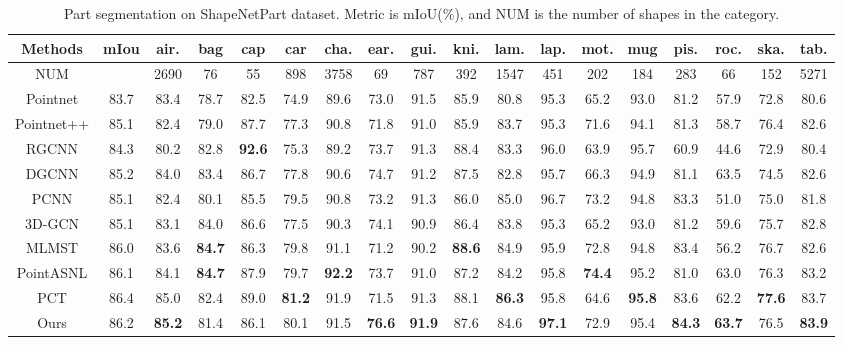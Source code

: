 \documentclass[conference]{IEEEtran}
\begin{document}
\begin{table*}[t]
\caption{Part segmentation  on ShapeNetPart dataset. Metric is mIoU(\%), and NUM is the number of shapes  in the category.}
\begin{center}
\vspace{-4mm}
\resizebox{1\textwidth}{19mm}
{
\begin{tabular}{c|c|c|c|c|c|c|c|c|c|c|c|c|c|c|c|c|c}
\hline
Methods& mIou & air. & bag & cap  & car & cha. & ear.  & gui. & kni. & lam. & lap. & mot. & mug & pis. & roc. & ska.  & tab.\\
\hline
NUM &  & 2690 & 76 & 55 & 898 & 3758 & 69 & 787 & 392 & 1547 & 451 & 202 & 184 & 283 & 66 & 152 & 5271 \\
\hline
Pointnet\cite{qi2017pointnet} & 83.7 & 83.4 &78.7 & 82.5 & 74.9 & 89.6 & 73.0 & 91.5 & 85.9 & 80.8 & 95.3 &65.2 & 93.0 & 81.2 & 57.9 & 72.8 & 80.6 \\
Pointnet++\cite{qi2017pointnet++} & 85.1 & 82.4 &79.0 & 87.7 & 77.3 & 90.8 & 71.8 & 91.0 & 85.9 & 83.7 & 95.3 &71.6 & 94.1 & 81.3 & 58.7 & 76.4 & 82.6 \\
RGCNN\cite{te2018rgcnn} & 84.3 & 80.2 &82.8 & \textbf{92.6} & 75.3 & 89.2 & 73.7 & 91.3 & 88.4 & 83.3 & 96.0 &63.9 & 95.7 & 60.9 & 44.6 & 72.9 & 80.4\\
DGCNN\cite{wang2019dynamic} & 85.2 & 84.0 &83.4 & 86.7 & 77.8 & 90.6 & 74.7 & 91.2 & 87.5 & 82.8 & 95.7 &66.3 & 94.9 & 81.1 & 63.5 & 74.5 & 82.6\\
PCNN\cite{atzmon2018point} & 85.1 & 82.4 &80.1 & 85.5 & 79.5 & 90.8 & 73.2 & 91.3 & 86.0 & 85.0 & 96.7 &73.2 & 94.8 & 83.3 & 51.0 & 75.0 & 81.8\\
3D-GCN\cite{lin2020convolution} & 85.1 & 83.1 & 84.0 & 86.6 & 77.5 & 90.3 & 74.1 & 90.9 & 86.4 & 83.8 & 95.3 &65.2 & 93.0 & 81.2 & 59.6 & 75.7 & 82.8\\
MLMST\cite{zhong2021point}& 86.0 & 83.6 &\textbf{84.7} & 86.3 & 79.8 & 91.1  & 71.2 & 90.2   & \textbf{88.6} & 84.9 & 95.9  & 72.8  & 94.8 & 83.4   &56.2 & 76.7 & 82.6  \\ 
PointASNL\cite{yan2020pointasnl} & 86.1 & 84.1 &\textbf{84.7} & 87.9 & 79.7 & \textbf{92.2} & 73.7 & 91.0 & 87.2 & 84.2 & 95.8 &\textbf{74.4} & 95.2 & 81.0 & 63.0 & 76.3 & 83.2\\
PCT\cite{guo2021pct} & 86.4 & 85.0 &82.4 & 89.0 & \textbf{81.2} & 91.9 & 71.5 & 91.3 & 88.1 & \textbf{86.3} & 95.8 &64.6 & \textbf{95.8} & 83.6 & 62.2 & \textbf{77.6} & 83.7\\
\hline
Ours & 86.2 & \textbf{85.2} &81.4 & 86.1 & 80.1 & 91.5 & \textbf{76.6} & \textbf{91.9} & 87.6 & 84.6 &\textbf{97.1} & 72.9 & 95.4 & \textbf{84.3} & \textbf{63.7} & 76.5 &\textbf{83.9}\\
\hline
\end{tabular}}
\end{center}
\vspace{-10pt}

\label{segmentation result}
\vspace{-10pt}
\end{table*}
\end{document}

